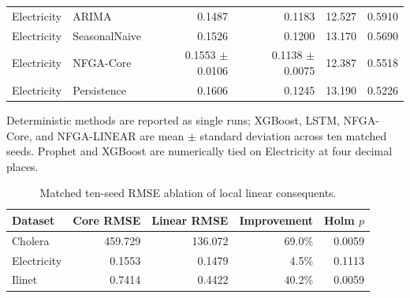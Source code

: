 \begin{table}[t]
\begin{tabular}{llrrrr}
Electricity & ARIMA & 0.1487 & 0.1183 & 12.527 & 0.5910 \\
Electricity & SeasonalNaive & 0.1526 & 0.1200 & 13.170 & 0.5690 \\
Electricity & NFGA-Core & 0.1553 $\pm$ 0.0106 & 0.1138 $\pm$ 0.0075 & 12.387 & 0.5518 \\
Electricity & Persistence & 0.1606 & 0.1245 & 13.190 & 0.5226 \\
\midrule
\bottomrule
\end{tabular}
\begin{minipage}{0.98\linewidth}
\footnotesize Deterministic methods are reported as single runs; XGBoost, LSTM, NFGA-Core, and NFGA-LINEAR are mean $\pm$ standard deviation across ten matched seeds. Prophet and XGBoost are numerically tied on Electricity at four decimal places.
\end{minipage}
\end{table}

\begin{table}[t]
\centering
\caption{Matched ten-seed RMSE ablation of local linear consequents.}
\label{tab:nfga_ablation}
\begin{tabular}{lrrrr}
\toprule
Dataset & Core RMSE & Linear RMSE & Improvement & Holm $p$ \\
\midrule
Cholera & 459.729 & 136.072 & 69.0\% & 0.0059 \\
Electricity & 0.1553 & 0.1479 & 4.5\% & 0.1113 \\
Ilinet & 0.7414 & 0.4422 & 40.2\% & 0.0059 \\
\bottomrule
\end{tabular}
\end{table}

